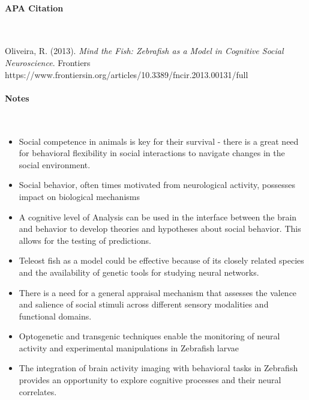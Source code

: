 \vspace*{-0.5cm}
\paragraph{APA Citation} \

\begin{hangparas}{.25in}{1}
Oliveira, R. (2013). \textit{Mind the Fish: Zebrafish as a Model in Cognitive Social Neuroscience}. Frontiers https://www.frontiersin.org/articles/10.3389/fncir.2013.00131/full
\end{hangparas}

\vspace*{-0.5cm}
\paragraph{Notes} \

\begin{itemize}
    \item Social competence in animals is key for their survival - there is a great need for behavioral flexibility in social interactions to navigate changes in the social environment.
    \item Social behavior, often times motivated from neurological activity, possesses impact on biological mechanisms
    \item A cognitive level of Analysis can be used in the interface between the brain and behavior to develop theories and hypotheses about social behavior. This allows for the testing of predictions. 
    \item Teleost fish as a model could be effective because of its closely related species and the availability of genetic tools for studying neural networks. 
    \item There is a need for a general appraisal mechanism that assesses the valence and salience of social stimuli across different sensory modalities and functional domains. 
    \item Optogenetic and transgenic techniques enable the monitoring of neural activity and experimental manipulations in Zebrafish larvae
    \item The integration of brain activity imaging with behavioral tasks in Zebrafish provides an opportunity to explore cognitive processes and their neural correlates.
\end{itemize}
    
\vspace*{-0.5cm}
